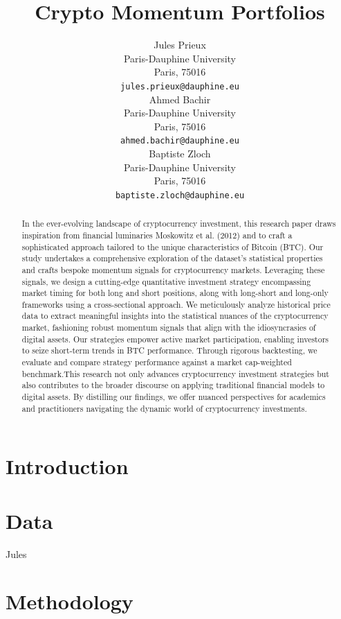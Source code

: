 \documentclass{article}
\title{Crypto Momentum Portfolios}
\author{
 Jules Prieux \\
  Paris-Dauphine University\\
  Paris, 75016  \\
  \texttt{jules.prieux@dauphine.eu} \\
   \And
 Ahmed Bachir \\
  Paris-Dauphine University\\
  Paris, 75016 \\
  \texttt{ahmed.bachir@dauphine.eu} \\
  \And
 Baptiste Zloch \\
  Paris-Dauphine University\\
  Paris, 75016 \\
  \texttt{baptiste.zloch@dauphine.eu} \\
}
\begin{document}
\maketitle
\begin{abstract}

	In the ever-evolving landscape of cryptocurrency investment, this research paper draws inspiration from financial luminaries Moskowitz et al. (2012) and \cite{buyingwinnerssellinglosers} to craft a sophisticated approach tailored to the unique characteristics of Bitcoin (BTC). \newline
	Our study undertakes a comprehensive exploration of the dataset's statistical properties and crafts bespoke momentum signals for cryptocurrency markets. Leveraging these signals, we design a cutting-edge quantitative investment strategy encompassing market timing for both long and short positions, along with long-short and long-only frameworks using a cross-sectional approach. We meticulously analyze historical price data to extract meaningful insights into the statistical nuances of the cryptocurrency market, fashioning robust momentum signals that align with the idiosyncrasies of digital assets. Our strategies empower active market participation, enabling investors to seize short-term trends in BTC performance. Through rigorous backtesting, we evaluate and compare strategy performance against a market cap-weighted benchmark.This research not only advances cryptocurrency investment strategies but also contributes to the broader discourse on applying traditional financial models to digital assets. By distilling our findings, we offer nuanced perspectives for academics and practitioners navigating the dynamic world of cryptocurrency investments.
\end{abstract}



\section{Introduction}
\section{Data}
Jules
\section{Methodology}
\end{document}
